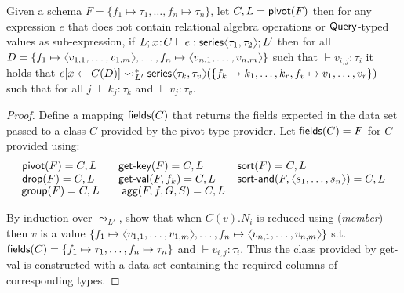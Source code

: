 \documentclass[a4paper,UKenglish]{lipics-v2016}
\theoremstyle{plain}
\theoremstyle{definition}
\newcommand{\vect}[1]{\langl #1 \rangl}
\newcommand{\langl}{\begin{picture}(4.5,7)
\put(1.1,2.5){\rotatebox{60}{\line(1,0){5.5}}}
\put(1.1,2.5){\rotatebox{300}{\line(1,0){5.5}}}
\end{picture}}
\newcommand{\rangl}{\begin{picture}(4.5,7)
\put(.9,2.5){\rotatebox{120}{\line(1,0){5.5}}}
\put(.9,2.5){\rotatebox{240}{\line(1,0){5.5}}}
\end{picture}}
\newcommand{\ident}[1]{\textnormal{\sffamily #1}}
\begin{document}
\begin{theorem}
\label{thm:pivot-safe}
Given a schema $F=\{f_1\mapsto\tau_1, \ldots, f_n\mapsto\tau_n \}$, let $C,L=\ident{pivot}(F)$ then for any 
expression $e$ that does not contain relational algebra operations or $\ident{Query}$-typed values as sub-expression, 
if $L;x\!:\!C \vdash e : \ident{series}\langl\tau_1,\tau_2\rangl; L'$ then for all $D = 
\{ f_1\mapsto\vect{v_{1,1},\ldots,v_{1,m}}, \ldots, f_n\mapsto\vect{v_{n,1},\ldots,v_{n,m}} \}$
such that $\vdash v_{i, j} : \tau_i$ it holds that $e[x\leftarrow C(D)]\leadsto_{L'}^{*} 
  \ident{series}\langl\tau_k,\tau_v\rangl(\{ f_k\mapsto{k_1,\ldots,k_r}, f_v\mapsto{v_1,\ldots,v_r} \})$
  such that for all $j$ $\vdash k_j : \tau_k$ and $\vdash v_j : \tau_v$.
\end{theorem}
\begin{proof}
Define a mapping $\ident{fields}(C)$ that returns the fields expected in the data set passed to a 
class $C$ provided by the pivot type provider. Let $\ident{fields}(C) = F$ for $C$ provided using:
\begin{equation*}
\begin{array}{l}
\begin{array}{lcl}
\ident{pivot}(F) = C, L &&
\ident{get-key}(F) = C, L \\
\ident{drop}(F) = C, L &&
\ident{get-val}(F, f_k) = C, L\\
\end{array}
\quad\begin{array}{l}
\ident{sort}(F) = C, L\\
\ident{sort-and}(F,\vect{s_1,\ldots,s_n}) = C, L\\
\end{array}\\[-0.1em]
\;\, \ident{group}(F) = C, L \;\;\,\quad \ident{agg}(F,f,G,S) = C, L
\end{array}
\end{equation*}

\noindent
By induction over $\leadsto_{L'}$, show that when $C(v).N_i$ is reduced using (\emph{member}) then 
$v$ is a value $\{ f_1\mapsto\vect{v_{1,1},\ldots,v_{1,m}}, \ldots, f_n\mapsto\vect{v_{n,1},\ldots,v_{n,m}} \}$
s.t. $\ident{fields}(C)=\{f_1\mapsto\tau_1, \ldots, f_n\mapsto\tau_n \}$ and 
$\vdash v_{i, j} : \tau_i$. Thus the class provided by \ident{get-val} is constructed with 
a data set containing the required columns of corresponding types.
\end{proof}
\end{document}
